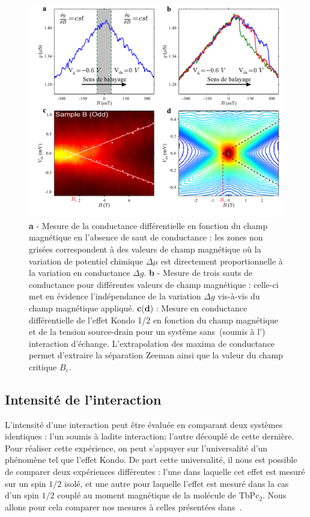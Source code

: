 \begin{figure}
\includegraphics[scale=0.45]{Resultats/AmplJump/AmplJump.pdf} 
\caption{\textbf{a} - Mesure de la conductance différentielle en fonction du champ magnétique en l'absence de saut de conductance : les zones non grisées correspondent à des valeurs de champ magnétique où la variation de potentiel chimique $\Delta \mu$ est directement proportionnelle à la variation en conductance $\Delta g$. \textbf{b} - Mesure de trois sauts de conductance pour différentes valeurs de champ magnétique : celle-ci met en évidence l'indépendance de la variation $\Delta g$ vis-à-vis du champ magnétique appliqué. \textbf{c}(\textbf{d}) : Mesure en conductance différentielle de l'effet Kondo 1/2 en fonction du champ magnétique et de la tension source-drain pour un système sans~(soumis à l') interaction d'échange. L'extrapolation des maxima de conductance permet d'extraire la séparation Zeeman ainsi que la valeur du champ critique $B_c$.}
\label{analyse_interaction}
\end{figure}

\subsection{Intensité de l'interaction}
L'intensité d'une interaction peut être évaluée en comparant deux systèmes identiques : l'un soumis à ladite interaction; l'autre découplé de cette dernière. Pour réaliser cette expérience, on peut s'appuyer sur l'universalité d'un phénomène tel que l'effet Kondo. De part cette universalité, il nous est possible de comparer deux expériences différentes : l'une dans laquelle cet effet est mesuré sur un spin $1/2$ isolé, et une autre pour laquelle l'effet est mesuré dans la cas d'un spin $1/2$ couplé au moment magnétique de la molécule de TbPc$_2$. Nous allons pour cela comparer nos mesures à celles présentées dans~\cite{Roch2009}.

